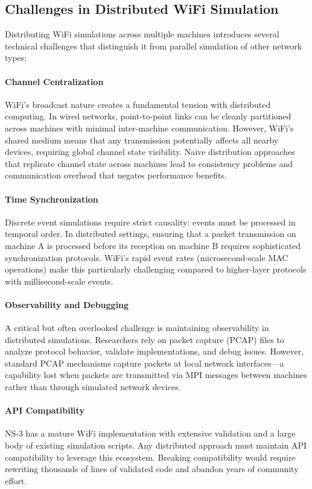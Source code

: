 \subsection{Challenges in Distributed WiFi Simulation}

Distributing WiFi simulations across multiple machines introduces several technical challenges that distinguish it from parallel simulation of other network types:

\paragraph{Channel Centralization}
WiFi's broadcast nature creates a fundamental tension with distributed computing. In wired networks, point-to-point links can be cleanly partitioned across machines with minimal inter-machine communication. However, WiFi's shared medium means that any transmission potentially affects all nearby devices, requiring global channel state visibility. Naive distribution approaches that replicate channel state across machines lead to consistency problems and communication overhead that negates performance benefits.

\paragraph{Time Synchronization}
Discrete event simulations require strict causality: events must be processed in temporal order. In distributed settings, ensuring that a packet transmission on machine A is processed before its reception on machine B requires sophisticated synchronization protocols. WiFi's rapid event rates (microsecond-scale MAC operations) make this particularly challenging compared to higher-layer protocols with millisecond-scale events.

\paragraph{Observability and Debugging}
A critical but often overlooked challenge is maintaining observability in distributed simulations. Researchers rely on packet capture (PCAP) files to analyze protocol behavior, validate implementations, and debug issues. However, standard PCAP mechanisms capture packets at local network interfaces—a capability lost when packets are transmitted via MPI messages between machines rather than through simulated network devices.

\paragraph{API Compatibility}
NS-3 has a mature WiFi implementation with extensive validation and a large body of existing simulation scripts. Any distributed approach must maintain API compatibility to leverage this ecosystem. Breaking compatibility would require rewriting thousands of lines of validated code and abandon years of community effort.

